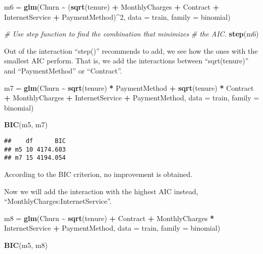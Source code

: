 \documentclass[
]{article}
\newenvironment{Shaded}{\begin{snugshade}}{\end{snugshade}}
\newcommand{\AttributeTok}[1]{\textcolor[rgb]{0.13,0.29,0.53}{#1}}
\newcommand{\CommentTok}[1]{\textcolor[rgb]{0.56,0.35,0.01}{\textit{#1}}}
\newcommand{\DecValTok}[1]{\textcolor[rgb]{0.00,0.00,0.81}{#1}}
\newcommand{\FunctionTok}[1]{\textcolor[rgb]{0.13,0.29,0.53}{\textbf{#1}}}
\newcommand{\NormalTok}[1]{#1}
\newcommand{\OtherTok}[1]{\textcolor[rgb]{0.56,0.35,0.01}{#1}}
\newcommand{\SpecialCharTok}[1]{\textcolor[rgb]{0.81,0.36,0.00}{\textbf{#1}}}
\begin{document}
\begin{Shaded}
\begin{Highlighting}[]
\NormalTok{m6 }\OtherTok{=} \FunctionTok{glm}\NormalTok{(Churn }\SpecialCharTok{\textasciitilde{}}\NormalTok{ (}\FunctionTok{sqrt}\NormalTok{(tenure) }\SpecialCharTok{+}\NormalTok{ MonthlyCharges }\SpecialCharTok{+}\NormalTok{ Contract }\SpecialCharTok{+}
\NormalTok{    InternetService }\SpecialCharTok{+}\NormalTok{ PaymentMethod)}\SpecialCharTok{\^{}}\DecValTok{2}\NormalTok{, }\AttributeTok{data =}\NormalTok{ train, }\AttributeTok{family =}\NormalTok{ binomial)}

\CommentTok{\# Use step function to find the combination that minimizes}
\CommentTok{\# the AIC.}
\FunctionTok{step}\NormalTok{(m6)}
\end{Highlighting}
\end{Shaded}

Out of the interaction ``step()'' recommends to add, we see how the ones
with the smallest AIC perform. That is, we add the interactions between
``sqrt(tenure)'' and ``PaymentMethod'' or ``Contract''.

\begin{Shaded}
\begin{Highlighting}[]
\NormalTok{m7 }\OtherTok{=} \FunctionTok{glm}\NormalTok{(Churn }\SpecialCharTok{\textasciitilde{}} \FunctionTok{sqrt}\NormalTok{(tenure) }\SpecialCharTok{*}\NormalTok{ PaymentMethod }\SpecialCharTok{+} \FunctionTok{sqrt}\NormalTok{(tenure) }\SpecialCharTok{*}
\NormalTok{    Contract }\SpecialCharTok{+}\NormalTok{ MonthlyCharges }\SpecialCharTok{+}\NormalTok{ InternetService }\SpecialCharTok{+}\NormalTok{ PaymentMethod,}
    \AttributeTok{data =}\NormalTok{ train, }\AttributeTok{family =}\NormalTok{ binomial)}

\FunctionTok{BIC}\NormalTok{(m5, m7)}
\end{Highlighting}
\end{Shaded}

\begin{verbatim}
##    df      BIC
## m5 10 4174.603
## m7 15 4194.054
\end{verbatim}

According to the BIC criterion, no improvement is obtained.

Now we will add the interaction with the highest AIC instead,
``MonthlyCharges:InternetService''.

\begin{Shaded}
\begin{Highlighting}[]
\NormalTok{m8 }\OtherTok{=} \FunctionTok{glm}\NormalTok{(Churn }\SpecialCharTok{\textasciitilde{}} \FunctionTok{sqrt}\NormalTok{(tenure) }\SpecialCharTok{+}\NormalTok{ Contract }\SpecialCharTok{+}\NormalTok{ MonthlyCharges }\SpecialCharTok{*}\NormalTok{ InternetService }\SpecialCharTok{+}
\NormalTok{    PaymentMethod, }\AttributeTok{data =}\NormalTok{ train, }\AttributeTok{family =}\NormalTok{ binomial)}

\FunctionTok{BIC}\NormalTok{(m5, m8)}
\end{Highlighting}
\end{Shaded}
\end{document}
